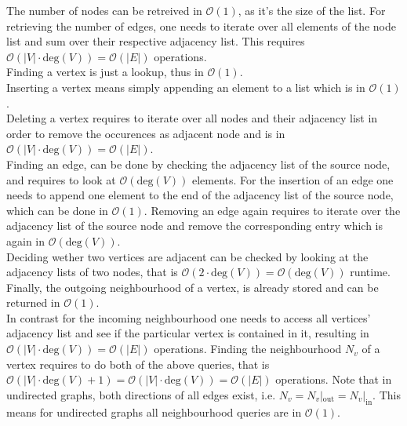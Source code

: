         The number of nodes can be retreived in $\mathcal{O}(1)$, as it's the size of the list.
        For retrieving the number of edges, one needs to iterate over all elements of the node list and sum over their respective adjacency list. This requires $\mathcal{O}(|V| \cdot \text{deg}(V)) = \mathcal{O}(|E|)$ operations. \\

        Finding a vertex is just a lookup, thus in $\mathcal{O}(1)$. \\
        Inserting a vertex means simply appending an element to a list which is in $\mathcal{O}(1)$. \\
        Deleting a vertex requires to iterate over all nodes and their adjacency list in order to remove the occurences as adjacent node and is in $\mathcal{O}(|V| \cdot \text{deg}(V)) = \mathcal{O}(|E|)$. \\
        
        Finding an edge, can be done by checking the adjacency list of the source node, and requires to look at $\mathcal{O}(\text{deg}(V))$ elements.
        For the insertion of an edge one needs to append one element to the end of the adjacency list of the source node, which can be done in $\mathcal{O}(1)$.
        Removing an edge again requires to iterate over the adjacency list of the source node and remove the corresponding entry which is again in $\mathcal{O}(\text{deg}(V))$. \\
        
        Deciding wether two vertices are adjacent can be checked by looking at the adjacency lists of two nodes, that is $\mathcal{O}(2 \cdot \text{deg}(V)) = \mathcal{O}(\text{deg}(V))$ runtime.\\
        
        Finally, the outgoing neighbourhood of a vertex, is already stored and can be returned in $\mathcal{O}(1)$.\\
        In contrast for the incoming neighbourhood one needs to access all vertices' adjacency list and see if the particular vertex is contained in it, resulting in $\mathcal{O}(|V| \cdot \text{deg}(V)) = \mathcal{O}(|E|)$ operations.
        Finding the neighbourhood $N_v$ of a vertex requires to do both of the above queries, that is $\mathcal{O}(|V| \cdot \text{deg}(V) + 1) = \mathcal{O}(|V| \cdot \text{deg}(V))  = \mathcal{O}(|E|)$ operations.  
        Note that in undirected graphs, both directions of all edges exist, i.e. $N_v = N_v |_\text{out} = N_v |_\text{in}$. This means for undirected graphs all neighbourhood queries are in $\mathcal{O}(1)$. \\
        
